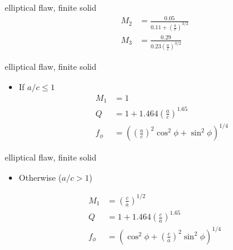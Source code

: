 \documentclass[
  letterpaper,
  ignorenonframetext,
  aspectratio=43,
  handout,
  12pt]{beamer}
\providecommand{\tightlist}{%
  \setlength{\itemsep}{0pt}\setlength{\parskip}{0pt}}
\providecommand{\tightlist}{%
\setlength{\itemsep}{0pt}\setlength{\parskip}{0pt}}
\begin{document}
\begin{frame}{elliptical flaw, finite solid}
\protect\hypertarget{elliptical-flaw-finite-solid-1}{}
\[\begin{aligned}
    M_2 &= \frac{0.05}{0.11+\left(\frac{a}{c}\right)^{3/2}}\\
    M_3 &= \frac{0.29}{0.23\left(\frac{a}{c}\right)^{3/2}}
\end{aligned}\]
\end{frame}

\begin{frame}{elliptical flaw, finite solid}
\protect\hypertarget{elliptical-flaw-finite-solid-2}{}
\begin{itemize}
\tightlist
\item
  If \(a/c \le 1\) \[\begin{aligned}
  M_1 &= 1\\
  Q &= 1+1.464\left(\frac{a}{c}\right)^{1.65}\\
  f_\phi &= \left(\left(\frac{a}{c}\right)^2 \cos^2 \phi + \sin^2 \phi \right)^{1/4}
  \end{aligned}\]
\end{itemize}
\end{frame}

\begin{frame}{elliptical flaw, finite solid}
\protect\hypertarget{elliptical-flaw-finite-solid-3}{}
\begin{itemize}
\tightlist
\item
  Otherwise (\(a/c > 1\))
\end{itemize}

\[\begin{aligned}
  M_1 &= \left(\frac{c}{a}\right)^{1/2}\\
  Q &= 1+1.464\left(\frac{c}{a}\right)^{1.65}\\
  f_\phi &= \left(\cos^2 \phi + \left(\frac{c}{a}\right)^2 \sin^2 \phi \right)^{1/4}
\end{aligned}\]
\end{frame}
\end{document}

